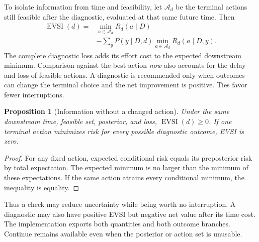 \documentclass{article}
\newtheorem{proposition}{Proposition}
\begin{document}
To isolate information from time and feasibility, let \(\mathcal A_d\)
be the terminal actions still feasible after the diagnostic, evaluated at
that same future time. Then
\begin{equation}
\begin{split}
 \operatorname{EVSI}(d)
 ={}&\min_{a\in\mathcal A_d}R_d(a\mid D)\\
 &-\sum_yP(y\mid D,d)
       \min_{a\in\mathcal A_d}R_d(a\mid D,y).
\end{split}
\label{eq:evsi}
\end{equation}
The complete diagnostic loss adds its effort cost to the expected downstream
minimum. Comparison against the best action \emph{now} also accounts for the
delay and loss of feasible actions. A diagnostic is recommended only when
outcomes can change the terminal choice and the net improvement is positive.
Ties favor fewer interruptions.

\begin{proposition}[Information without a changed action]
Under the same downstream time, feasible set, posterior, and loss,
\(\operatorname{EVSI}(d)\ge0\). If one terminal action minimizes risk for every
possible diagnostic outcome, EVSI is zero.
\end{proposition}
\begin{proof}
For any fixed action, expected conditional risk equals its preposterior risk
by total expectation. The expected minimum is no larger than the minimum
of these expectations. If the same action attains every conditional minimum,
the inequality is equality.
\end{proof}

Thus a check may reduce uncertainty while being worth no interruption.
A diagnostic may also have positive EVSI but negative net value after its
time cost. The implementation exports both quantities and both outcome
branches. Continue remains available even when the posterior or action set
is unusable.





\end{document}
